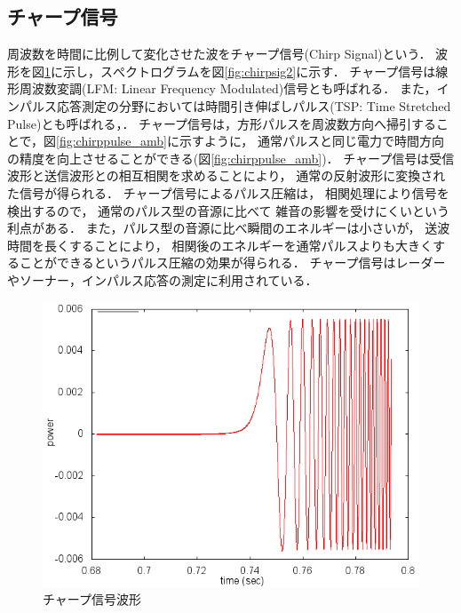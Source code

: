 \subsection{チャープ信号}

周波数を時間に比例して変化させた波をチャープ信号(Chirp Signal)という．
波形を図\ref{fig:chirpsig}に示し，スぺクトログラムを図\ref{fig:chirpsig2}に示す．
チャープ信号は線形周波数変調(LFM: Linear Frequency Modulated)信号とも呼ばれる．
また，インパルス応答測定の分野においては時間引き伸ばしパルス(TSP: Time Stretched Pulse)とも呼ばれる\cite{Aoshima}，．
チャープ信号は，方形パルスを周波数方向へ掃引することで，図\ref{fig:chirppulse_amb}に示すように，
通常パルスと同じ電力で時間方向の精度を向上させることができる(図\ref{fig:chirppulse_amb})．
チャープ信号は受信波形と送信波形との相互相関を求めることにより，
通常の反射波形に変換された信号が得られる．
チャープ信号によるパルス圧縮は，
相関処理により信号を検出するので，
通常のパルス型の音源に比べて
雑音の影響を受けにくいという利点がある．
また，パルス型の音源に比べ瞬間のエネルギーは小さいが，
送波時間を長くすることにより，
相関後のエネルギーを通常パルスよりも大きくすることができるというパルス圧縮の効果が得られる．
チャープ信号はレーダーやソーナー，インパルス応答の測定に利用されている．


\begin{figure}[p]\centering
\includegraphics[clip,width=1.0\hsize]{img/chirp.png}
\caption{チャープ信号波形}\label{fig:chirpsig}
\end{figure}

